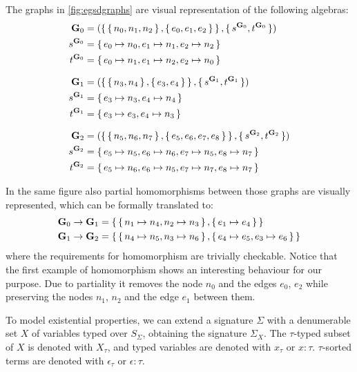 \begin{example}
The graphs in \autoref{fig:egsdgraphs} are visual representation of the following algebras:
\begin{align*}
  \mathbf{G}_0 &= (\set{\set{n_0, n_1, n_2},\set{e_0, e_1, e_2}}, \set{s^{\mathbf{G}_0}, t^{\mathbf{G}_0}}) \\
  s^{\mathbf{G}_0} &= \set{e_0 \mapsto n_0, e_1 \mapsto n_1, e_2 \mapsto n_2} \\
  t^{\mathbf{G}_0} &= \set{e_0 \mapsto n_1, e_1 \mapsto n_2, e_2 \mapsto n_0} \\[1.5ex]
  \mathbf{G}_1 &= (\set{\set{n_3,n_4},\set{e_3,e_4}},\set{s^{\mathbf{G}_1},t^{\mathbf{G}_1}}) \\
  s^{\mathbf{G}_1} &= \set{e_3 \mapsto n_3, e_4 \mapsto n_4} \\
  t^{\mathbf{G}_1} &= \set{e_3 \mapsto e_3, e_4 \mapsto n_3} \\[1.5ex]
  \mathbf{G}_2 &= (\set{\set{n_5,n_6,n_7},\set{e_5,e_6,e_7,e_8}},\set{s^{\mathbf{G}_2},t^{\mathbf{G}_2}}) \\
  s^{\mathbf{G}_2} &= \set{e_5 \mapsto n_5,e_6 \mapsto n_6,e_7\mapsto n_5, e_8 \mapsto n_7} \\
  t^{\mathbf{G}_2} &= \set{e_5 \mapsto n_6,e_6 \mapsto n_5,e_7 \mapsto n_7, e_8 \mapsto n_7}
\end{align*}

In the same figure also partial homomorphisms between those graphs are visually represented, which can be formally translated to:
\begin{align*}
  \mathbf{G}_0 \to \mathbf{G}_1 &= \set{\set{n_1 \mapsto n_4,n_2 \mapsto n_3},\set{e_1 \mapsto e_4}} \\
  \mathbf{G}_1 \to \mathbf{G}_2 &= \set{\set{n_4 \mapsto n_5, n_3 \mapsto n_6},\set{e_4 \mapsto e_5, e_3 \mapsto e_6}}
\end{align*}
 where the
requirements for homomorphism are trivially checkable. Notice that the first example of homomorphism shows an interesting
behaviour for our purpose. Due to partiality it removes the node $n_0$ and the edges $e_0$, $e_2$ while preserving
the nodes $n_1$, $n_2$ and the edge $e_1$ between them.
\end{example}

To model existential properties, we can extend a signature $\Sigma$ with a denumerable set $X$ of variables typed over
$S_\Sigma$, obtaining the signature $\Sigma_X$. The $\tau$-typed subset of $X$ is denoted with $X_\tau$, and typed
variables are denoted with $x_\tau$ or $x : \tau$. $\tau$-sorted terms are denoted with $\epsilon_\tau$ or $\epsilon :
\tau$.

